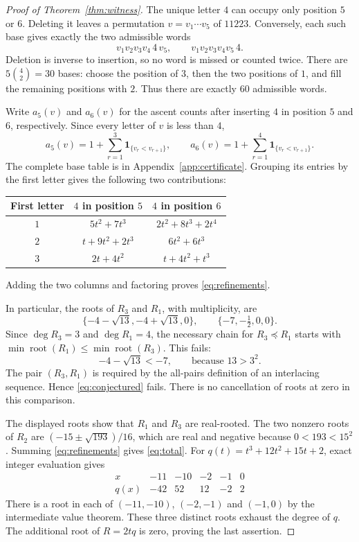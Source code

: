 \documentclass[11pt]{article}
\begin{document}
\begin{proof}[Proof of Theorem~\ref{thm:witness}]
The unique letter $4$ can occupy only position $5$ or $6$. Deleting it
leaves a permutation $v=v_1\cdots v_5$ of $11223$. Conversely, each such
base gives exactly the two admissible words
\[
 v_1v_2v_3v_4\,4\,v_5,
 \qquad
 v_1v_2v_3v_4v_5\,4.
\]
Deletion is inverse to insertion, so no word is missed or counted twice.
There are $5\binom42=30$ bases: choose the position of $3$, then the
two positions of $1$, and fill the remaining positions with $2$.
Thus there are exactly $60$ admissible words.

Write $a_5(v)$ and $a_6(v)$ for the ascent counts after inserting $4$
in position $5$ and $6$, respectively. Since every letter of $v$ is
less than $4$,
\begin{equation}\label{eq:insertion}
 a_5(v)=1+\sum_{r=1}^3\mathbf{1}_{\{v_r<v_{r+1}\}},
 \qquad
 a_6(v)=1+\sum_{r=1}^4\mathbf{1}_{\{v_r<v_{r+1}\}}.
\end{equation}
The complete base table is in Appendix~\ref{app:certificate}.
Grouping its entries by the first letter gives the following two
contributions:
\begin{center}
\begin{tabular}{ccc}
\toprule
First letter & $4$ in position $5$ & $4$ in position $6$\\
\midrule
$1$ & $5t^2+7t^3$ & $2t^2+8t^3+2t^4$\\
$2$ & $t+9t^2+2t^3$ & $6t^2+6t^3$\\
$3$ & $2t+4t^2$ & $t+4t^2+t^3$\\
\bottomrule
\end{tabular}
\end{center}
Adding the two columns and factoring proves \eqref{eq:refinements}.

In particular, the roots of $R_3$ and $R_1$, with multiplicity, are
\[
 \{-4-\sqrt{13},-4+\sqrt{13},0\},
 \qquad
 \{-7,-\tfrac12,0,0\}.
\]
Since $\deg R_3=3$ and $\deg R_1=4$, the necessary chain for
$R_3\preceq R_1$ starts with
$\min\operatorname{root}(R_1)\leq\min\operatorname{root}(R_3)$.
This fails:
\begin{equation}\label{eq:obstruction}
 -4-\sqrt{13}<-7,
 \qquad\text{because }13>3^2.
\end{equation}
The pair $(R_3,R_1)$ is required by the all-pairs definition of an
interlacing sequence. Hence \eqref{eq:conjectured} fails.
There is no cancellation of roots at zero in this comparison.

The displayed roots show that $R_1$ and $R_3$ are real-rooted.
The two nonzero roots of $R_2$ are
$(-15\pm\sqrt{193})/16$, which are real and negative because
$0<193<15^2$. Summing \eqref{eq:refinements} gives \eqref{eq:total}.
For $q(t)=t^3+12t^2+15t+2$, exact integer evaluation gives
\[
\begin{array}{c|rrrrr}
x&-11&-10&-2&-1&0\\\hline
q(x)&-42&52&12&-2&2
\end{array}
\]
There is a root in each of $(-11,-10)$, $(-2,-1)$ and $(-1,0)$ by
the intermediate value theorem. These three distinct roots exhaust the
degree of $q$. The additional root of $R=2tq$ is zero, proving the last
assertion.
\end{proof}
\end{document}
